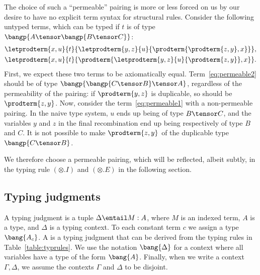 \documentclass{llncs}
\begin{document}
The choice of such a ``permeable'' pairing is more
or less forced on us by our desire to have no explicit term syntax for
structural rules. Consider the following untyped terms, 
which can be typed if $t$ is of type $\bangp{A\tensor
\bangp{B\tensor C}}$:
\begin{gather}
\letprodterm{x,u}{t}{
  \letprodterm{y,z}{u}{\prodterm{\prodterm{z,y},x}}
},\label{eq:permeable1}\\
\letprodterm{x,u}{t}{
  \prodterm{\letprodterm{y,z}{u}{\prodterm{z,y}},x}
}.\label{eq:permeable2}
\end{gather}
First, we expect these two terms to be axiomatically
equal. Term~\eqref{eq:permeable2} should be of type
$\bangp{\bangp{C\tensor B}\tensor A}$, regardless of the permeability
of the pairing: if $\prodterm{y,z}$ is duplicable, so should be
$\prodterm{z,y}$. Now, consider the term~\eqref{eq:permeable1} with a
non-permeable pairing. In the naive type system, $u$ ends up being of type $B\tensor C$, and the variables $y$ and $z$ in the final
recombination end up being respectively of type $B$ and
$C$. It is not possible to make $\prodterm{z,y}$ of the duplicable type
$\bangp{C\tensor B}$. 

We therefore choose a permeable pairing, which will be reflected,
albeit subtly, in the typing rule $(\otimes.I)$ and $(\otimes.E)$ in
the following section.


\subsection{Typing judgments}
\label{sec:typjudg}

A typing judgment
is a tuple $\Delta\entail M:A$, where $M$ is an indexed term, $A$ is a
type, and $\Delta$ is a typing context.
To each constant term $c$ we assign a type $\bang{A_c}$.
A  is a typing judgment that can be
derived from the typing rules in Table~\ref{table:typrules}.
We use the notation $\bang{\Delta}$ for a context where all variables
have a type of the form $\bang{A}$. Finally, when we write a context
$\Gamma,\Delta$, we assume the contexts $\Gamma$ and $\Delta$ to be
disjoint.
\end{document}
